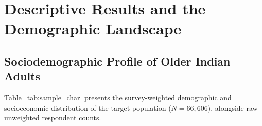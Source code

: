 
\section{Descriptive Results and the Demographic Landscape}

\subsection{Sociodemographic Profile of Older Indian Adults}
Table~\ref{tab:sample_char} presents the survey-weighted demographic and socioeconomic distribution of the target population ($N = 66,606$), alongside raw unweighted respondent counts.

